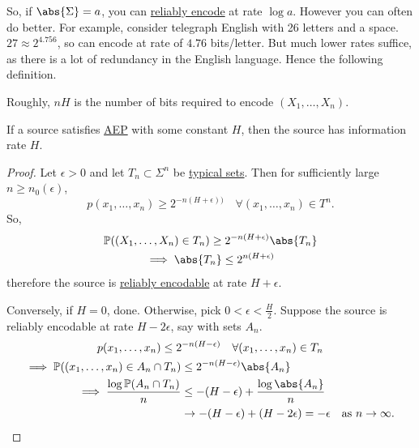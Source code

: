 \documentclass{article}
\newcommand{\Prob}{\mathbb{P}}
\newcommand{\1}[1]{\mathbbm{1}_{#1}}
\begin{document}
So, if $\abs{\Sigma}=a$, you can \hyperlink{def:reliablyEncode}{reliably encode} at rate $\log a$. However you can often do better.
For example, consider telegraph English with 26 letters and a space. $27 \approx 2^{4.756}$, so can encode at rate of $4.76$ bits/letter. But much lower rates suffice, as there is a lot of redundancy in the English language.
Hence the following definition.
Roughly, $nH$ is the number of bits required to encode $(X_1, \dotsc, X_n)$.
\begin{nthm}
    If a source satisfies \hyperlink{def:aep}{AEP} with some constant $H$, then the source has information rate $H$.
\end{nthm}
\begin{proof}Let $\epsilon > 0$ and let $T_n \subset \Sigma^n$ be \hyperlink{def:typicalSet}{typical sets}.
    Then for sufficiently large $n \geq n_0(\epsilon)$,
    \begin{equation*}
        p(x_1, \dotsc, x_n) \geq 2^{-n (H + \epsilon))} \quad \forall (x_1, \dotsc, x_n) \in T^n.
    \end{equation*}
    So,
    \begin{gather*}
        \Prob(\left(X_1, \dotsc, X_n\right) \in T_n) \geq 2^{-n(H+\epsilon)} \abs{T_n} \\
        \implies \abs{T_n} \leq 2^{n(H+\epsilon)}
    \end{gather*}
    therefore the source is \hyperlink{def:reliablyEncode}{reliably encodable} at rate $H+\epsilon$.

    Conversely, if $H=0$, done. Otherwise, pick $0 < \epsilon < \frac{H}{2}$. Suppose the source is reliably encodable at rate $H - 2 \epsilon$, say with sets $A_n$.
    \begin{gather*}
        p(x_1, \dotsc, x_n) \leq 2^{-n(H-\epsilon)} \quad \forall (x_1, \dotsc, x_n) \in T_n \\
        \begin{aligned}
            \implies \Prob((x_1, \dotsc, x_n) \in A_n \cap T_n) &\leq 2^{-n (H-\epsilon)} \abs{A_n} \\
            \implies \frac{\log \Prob(A_n \cap T_n)}{n} &\leq -(H-\epsilon) + \frac{\log \abs{A_n}}{n} \\
                                                    &\to -(H-\epsilon) + (H-2 \epsilon) = -\epsilon \quad \text{as } n \to \infty. \qedhere
        \end{aligned}
    \end{gather*}
\end{proof}
\end{document}
